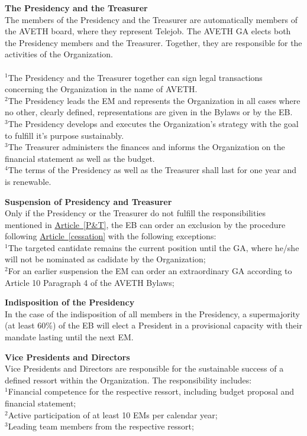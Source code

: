 \documentclass[10pt]{article}
\newcounter{qcounter}
\begin{document}
\begin{list}{{\bf Article :~}}{}
\item {\bf The Presidency and the Treasurer}\label{P&T}\\
The members of the Presidency and the Treasurer are automatically members of the AVETH board, where they represent Telejob. The AVETH GA elects both the Presidency members and the Treasurer. Together, they are responsible for the activities of the Organization. \\\\
$^{1}$The Presidency and the Treasurer together can sign legal transactions concerning the Organization in the name of AVETH.\\
$^{2}$The Presidency leads the EM and represents the Organization in all cases where no other, clearly defined, representations are given in the Bylaws or by the EB. \\
$^{3}$The Presidency develops and executes the Organization's strategy with the goal to fulfill it's purpose sustainably.\\
$^{3}$The Treasurer administers the finances and informs the Organization on the financial statement as well as the budget.\\
$^{4}$The terms of the Presidency as well as the Treasurer shall last for one year and is renewable.

\item {\bf Suspension of Presidency and Treasurer}\\
Only if the Presidency or the Treasurer do not fulfill the responsibilities mentioned in \hyperref[P&T]{Article~\ref{P&T}}, the EB can order an exclusion by the procedure following \hyperref[cessation]{Article~\ref{cessation}} with the following exceptions:\\
$^{1}$The targeted cantidate remains the current position until the GA, where he/she will not be nominated as cadidate by the Organization;\\
$^{2}$For an earlier suspension the EM can order an extraordinary GA according to Article 10 Paragraph 4 of the AVETH Bylaws;

\item {\bf Indisposition of the Presidency}\\
In the case of the indisposition of all members in the Presidency, a supermajority (at least 60\%) of the EB will elect a President in a provisional capacity with their mandate lasting until the next EM. 

\item {\bf Vice Presidents and Directors}\\\label{VP&D}
Vice Presidents and Directors are responsible for the sustainable success of a defined ressort within the Organization. The responsibility includes:\\
$^{1}$Financial competence for the respective ressort, including budget proposal and financial statement;\\ 
$^{2}$Active participation of at least 10 EMs per calendar year;\\
$^{3}$Leading team members from the respective ressort;\\


\end{list}
\end{document}
